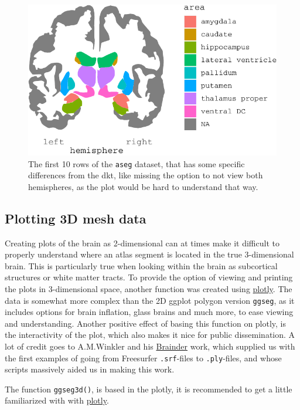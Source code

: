 \documentclass[fleqn,10pt]{wlpeerj} %
\begin{document}
\begin{figure}
\centering
\includegraphics{draft_1_files/figure-latex/atlases-1.pdf}
\caption{\label{fig:atlases}The first 10 rows of the \texttt{aseg} dataset, that has some specific differences from the dkt, like missing the option to not view both hemispheres, as the plot would be hard to understand that way.}
\end{figure}

\hypertarget{plotting-3d-mesh-data}{%
\subsection{Plotting 3D mesh data}\label{plotting-3d-mesh-data}}

Creating plots of the brain as 2-dimensional can at times make it difficult to properly understand where an atlas segment is located in the true 3-dimensional brain.
This is particularly true when looking within the brain as subcortical structures or white matter tracts.
To provide the option of viewing and printing the plots in 3-dimensional space, another function was created using \href{https://plotly-book.cpsievert.me/}{plotly}.
The data is somewhat more complex than the 2D ggplot polygon version \texttt{ggseg}, as it includes options for brain inflation, glass brains and much more, to ease viewing and understanding.
Another positive effect of basing this function on plotly, is the interactivity of the plot, which also makes it nice for public dissemination.
A lot of credit goes to A.M.Winkler and his \href{https://brainder.org/}{Brainder} work, which supplied us with the first examples of going from Freesurfer \texttt{.srf}-files to \texttt{.ply}-files, and whose scripts massively aided us in making this work.

The function \texttt{ggseg3d()}, is based in the plotly, it is recommended to get a little familiarized with with \href{https://plotly-book.cpsievert.me/}{plotly}.
\end{document}
